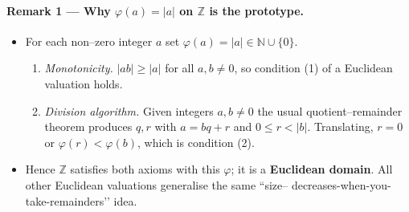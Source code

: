 \documentclass[12pt]{article}
\theoremstyle{definition} %
\theoremstyle{plain} %
\begin{document}
\paragraph*{Remark 1 — Why \(\varphi(a)=|a|\) on \(\mathbb Z\) is the prototype.}
\begin{itemize}
  \item For each non–zero integer \(a\) set \(\varphi(a)=|a|\in\mathbb N\cup\{0\}\).
        \begin{enumerate}
          \item \emph{Monotonicity.}\;
                \(|ab|\ge|a|\) for all \(a,b\neq0\), so condition (1) of a
                Euclidean valuation holds.
          \item \emph{Division algorithm.}\;
                Given integers \(a,b\neq0\) the usual quotient–remainder
                theorem produces \(q,r\) with \(a=bq+r\) and
                \(0\le r<|b|\).
                Translating, \(r=0\) or \(\varphi(r)<\varphi(b)\),
                which is condition (2).
        \end{enumerate}
  \item Hence \(\mathbb Z\) satisfies both axioms with this \(\varphi\); it is a
        \textbf{Euclidean domain}.  
        All other Euclidean valuations generalise the same “size–
        decreases-when-you-take-remainders’’ idea.
\end{itemize}

\bigskip
\end{document}
